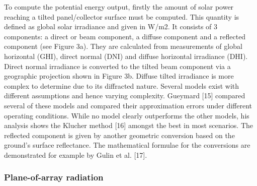 To compute the potential energy output, firstly the amount of solar power reaching a tilted panel/collector surface must be computed. This quantity is defined as global solar irradiance and given in W/m2. It consists of 3 components: a direct or beam component, a diffuse component and a reflected component (see Figure 3a). They are calculated from measurements of global horizontal (GHI), direct normal (DNI) and diffuse horizontal irradiance (DHI). Direct normal irradiance is converted to the tilted beam component via a geographic projection shown in Figure 3b. Diffuse tilted irradiance is more complex to determine due to its diffracted nature. Several models exist with different assumptions and hence varying complexity. Gueymard [15] compared several of these models and compared their approximation errors under different operating conditions. While no model clearly outperforms the other models, his analysis shows the Klucher method [16] amongst the best in most scenarios. The reflected component is given by another geometric conversion based on the ground’s surface reflectance. The mathematical formulae for the conversions are demonstrated for example by Gulin et al. [17].


\subsubsection{Plane-of-array radiation}
\label{app:irrad}


